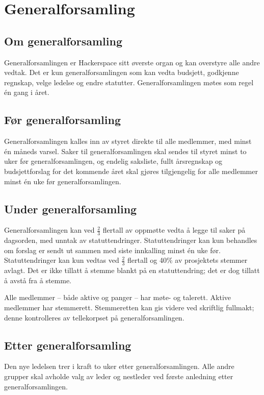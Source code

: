 \section{Generalforsamling}\label{sec:generalforsamling}
\subsection{Om generalforsamling}\label{sec:generalforsamling:om}
Generalforsamlingen er Hackerspace sitt øverste organ og kan overstyre alle andre vedtak.
Det er kun generalforsamlingen som kan vedta budsjett, godkjenne regnskap, velge ledelse og endre statutter.
Generalforsamlingen møtes som regel én gang i året.

\subsection{Før generalforsamling}\label{sec:generalforsamling:før}
Generalforsamlingen kalles inn av styret direkte til alle medlemmer, med minst én måneds varsel.
Saker til generalforsamlingen skal sendes til styret minst to uker før generalforsamlingen, og endelig saksliste, fullt årsregnskap og budsjettforslag for det kommende året skal gjøres tilgjengelig for alle medlemmer minst én uke før generalforsamlingen.

\subsection{Under generalforsamling}\label{sec:generalforsamling:under}
Generalforsamlingen kan ved $\frac{2}{3}$ flertall av oppmøtte vedta å legge til saker på dagsorden, med unntak av statuttendringer.
Statuttendringer kan kun behandles om forslag er sendt ut sammen med siste innkalling minst én uke før.
Statuttendringer kan kun vedtas ved $\frac{2}{3}$ flertall og 40\% av prosjektets stemmer avlagt.
Det er ikke tillatt å stemme blankt på en statuttendring; det er dog tillatt å avstå fra å stemme.

Alle medlemmer -- både aktive og panger -- har møte- og talerett.
Aktive medlemmer har stemmerett.
Stemmeretten kan gis videre ved skriftlig fullmakt; denne kontrolleres av tellekorpset på generalforsamlingen.

\subsection{Etter generalforsamling}\label{sec:generalforsamling:etter}
Den nye ledelsen trer i kraft to uker etter generalforsamlingen.
Alle andre grupper skal avholde valg av leder og nestleder ved første anledning etter generalforsamlingen.

